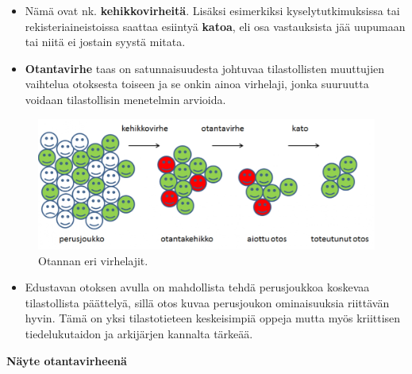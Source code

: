 \documentclass[
]{book}
\providecommand{\tightlist}{%
  \setlength{\itemsep}{0pt}\setlength{\parskip}{0pt}}
\begin{document}
\begin{itemize}
\begin{itemize}
    \begin{itemize}
    \tightlist
    \item
      Nämä ovat nk. \textbf{kehikkovirheitä}. Lisäksi esimerkiksi kyselytutkimuksissa tai rekisteriaineistoissa saattaa esiintyä \textbf{katoa}, eli osa vastauksista jää uupumaan tai niitä ei jostain syystä mitata.
    \item
      \textbf{Otantavirhe} taas on satunnaisuudesta johtuvaa tilastollisten muuttujien vaihtelua otoksesta toiseen ja se onkin ainoa virhelaji, jonka suuruutta voidaan tilastollisin menetelmin arvioida.
    \end{itemize}
  \end{itemize}
\end{itemize}

\begin{figure}

{\centering \includegraphics[width=1\linewidth]{images/otanta} 

}

\caption{Otannan eri virhelajit.}\label{fig:otanta}
\end{figure}

\begin{itemize}
\tightlist
\item
  Edustavan otoksen avulla on mahdollista tehdä perusjoukkoa koskevaa tilastollista päättelyä, sillä otos kuvaa perusjoukon ominaisuuksia riittävän hyvin. Tämä on yksi tilastotieteen keskeisimpiä oppeja mutta myös kriittisen tiedelukutaidon ja arkijärjen kannalta tärkeää.
\end{itemize}

\textbf{Näyte otantavirheenä}
\end{document}
